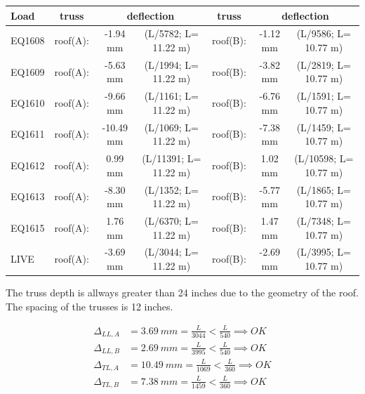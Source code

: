 \begin{center}
  \begin{scriptsize}
  \begin{tabular}{|l|c|c|c|c|c|c|}
    \hline
    \textbf{Load} & \textbf{truss} & \multicolumn{2}{c|}{\textbf{deflection}} & \textbf{truss} & \multicolumn{2}{c|}{\textbf{deflection}} \\
    \hline
EQ1608 & roof(A): & -1.94 mm & (L/5782; L= 11.22 m) & roof(B): &-1.12 mm & (L/9586; L= 10.77 m) \\
EQ1609 & roof(A): & -5.63 mm & (L/1994; L= 11.22 m) & roof(B): & -3.82 mm & (L/2819; L= 10.77 m) \\
EQ1610 & roof(A): & -9.66 mm & (L/1161; L= 11.22 m) & roof(B): & -6.76 mm & (L/1591; L= 10.77 m) \\
EQ1611 & roof(A): & -10.49 mm & (L/1069; L= 11.22 m) & roof(B): & -7.38 mm & (L/1459; L= 10.77 m) \\
EQ1612 & roof(A): & 0.99 mm & (L/11391; L= 11.22 m) & roof(B): & 1.02 mm & (L/10598; L= 10.77 m) \\
EQ1613 & roof(A): & -8.30 mm & (L/1352; L= 11.22 m) & roof(B): & -5.77 mm & (L/1865; L= 10.77 m) \\
EQ1615 & roof(A): & 1.76 mm & (L/6370; L= 11.22 m) & roof(B): & 1.47 mm & (L/7348; L= 10.77 m) \\
LIVE & roof(A): & -3.69 mm & (L/3044; L= 11.22 m) & roof(B): & -2.69 mm & (L/3995; L= 10.77 m) \\
\hline
  \end{tabular}
  \end{scriptsize}
\end{center}

\noindent The truss depth is allways greater than 24 inches due to the geometry of the roof. The spacing of the trusses is 12 inches.

\begin{align}
\Delta_{LL,A} &= 3.69\ mm= \frac{L}{3044} < \frac{L}{540} \implies OK \\
\Delta_{LL,B} &= 2.69\ mm= \frac{L}{3995} < \frac{L}{540} \implies OK \\
\Delta_{TL,A} &= 10.49\ mm= \frac{L}{1069} < \frac{L}{360} \implies OK \\
\Delta_{TL,B} &= 7.38\ mm= \frac{L}{1459} < \frac{L}{360} \implies OK
\end{align}

